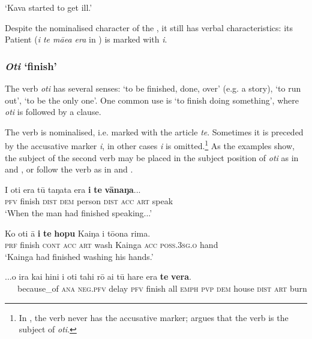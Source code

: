 \glt
‘Kava started to get ill.’ \textstyleExampleref{[R229.224]} 
\z

Despite the nominalised character of the , it still has verbal characteristics: its Patient (\textit{i te mā{\ꞌ}ea era} in ) is marked with \textit{i}.
\subsubsection{\textit{Oti} ‘finish’}\label{sec:11.3.2.2}
The verb \textit{oti} has several senses: ‘to be finished, done, over’ (e.g. a story), ‘to run out’, ‘to be the only one’. One common use is ‘to finish doing something’, where \textit{oti} is followed by a  clause.

The  verb is nominalised, i.e. marked with the article \textit{te}. Sometimes it is preceded by the accusative marker \textit{i}, in other cases \textit{i} is omitted.\footnote{\label{fn:506}In , the  verb never has the accusative marker; \citet{Hooper1984Unusual} argues that the  verb is the subject of \textit{oti}.}  As the examples show, the subject of the second verb may be placed in the subject position of \textit{oti} as in  and , or follow the  verb as in  and .

\ea\label{ex:11.50}
\gll I oti era tū taŋata era \textbf{i} \textbf{te} \textbf{vānaŋa}...\\
\textsc{pfv} finish \textsc{dist} \textsc{dem} person \textsc{dist} \textsc{acc} \textsc{art} speak\\

\glt 
‘When the man had finished speaking...’ \textstyleExampleref{[R315.377]} 
\z

\ea\label{ex:11.51}
\gll Ko oti {\ꞌ}ā \textbf{i} \textbf{te} \textbf{hopu} Kaiŋa i tō{\ꞌ}ona rima. \\
\textsc{prf} finish \textsc{cont} \textsc{acc} \textsc{art} wash Kainga \textsc{acc} \textsc{poss.3sg.o} hand \\

\glt 
‘Kainga had finished washing his hands.’ \textstyleExampleref{[R243.078]} 
\z

\ea\label{ex:11.52}
\gll ...{\ꞌ}o ira kai hini i oti tahi rō ai tū hare era \textbf{te} \textbf{vera}. \\
~~~because\_of \textsc{ana} \textsc{neg.pfv} delay \textsc{pfv} finish all \textsc{emph} \textsc{pvp} \textsc{dem} house \textsc{dist} \textsc{art} burn \\

